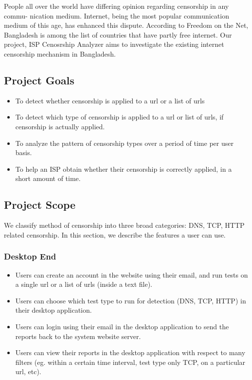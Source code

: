 
People all over the world have differing opinion regarding censorship in any commu-
nication medium. Internet, being the most popular communication medium of this
age, has enhanced this dispute. According to Freedom on the Net, Bangladesh is among
the list of countries that have partly free internet. Our project, ISP Cenosrship Analyzer aims to
investigate the existing internet censorship mechanism in Bangladesh.


\subsection{Project Goals}

	\begin{itemize}
	
	\item To detect whether censorship is applied to a url or a list of urls
	\item To detect which type of censorship is applied to a url or list of urls, if censorship is actually applied.
	\item To analyze the pattern of censorship types over a period of time per user basis.
	\item To help an ISP obtain whether their censorship is correctly applied, in a short amount of time.
	
	\end{itemize}
	
	
\subsection{Project Scope}
	We classify method of censorship into three broad categories: DNS, TCP, HTTP related censorship.
	In this section, we describe the features a user can use.
	
\subsubsection{Desktop End}
	\begin{itemize}	
		\item Users can create an account in the website using their email, and run tests on a single url or a list of urls (inside a text file).
		\item Users can choose which test type to run for detection (DNS, TCP, HTTP) in their desktop application.
		\item Users can login using their email in the desktop application to send the reports back to the system website server.
		\item Users can view their reports in the desktop application with respect to many filters (eg. within a certain time interval, test type only TCP, on a particular url, etc).
	\end{itemize}

